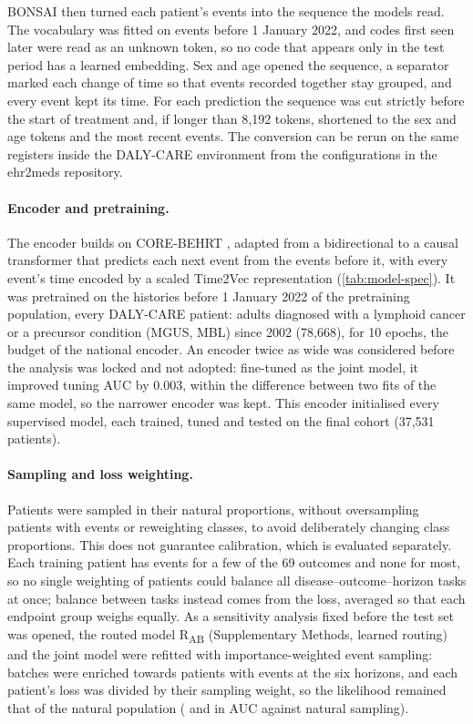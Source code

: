 BONSAI \citep{montgomery2025bonsai} then turned each patient's events into the
sequence the models read. The vocabulary was fitted on events before 1 January
2022, and codes first seen later were read as an unknown token, so no code that
appears only in the test period has a learned embedding. Sex and age opened the
sequence, a separator marked each change of time so that events recorded
together stay grouped, and every event kept its time. For each prediction the
sequence was cut strictly before the start of treatment and, if longer than
8,192 tokens, shortened to the sex and age tokens and the most recent events.
The conversion can be rerun on the same registers inside the DALY-CARE
environment from the configurations in the ehr2meds repository.


\paragraph{Encoder and pretraining.} The encoder builds on CORE-BEHRT
\citep{odgaard2024core}, adapted from a bidirectional to a causal transformer
\citep{vaswani2017attention} that predicts each next event from the events
before it, with every event's time encoded by a scaled Time2Vec representation
\citep{kazemi2019time2vec} (\cref{tab:model-spec}). It was pretrained on the
histories before 1 January 2022 of the pretraining population, every DALY-CARE
patient: adults diagnosed with a lymphoid cancer or a precursor condition (MGUS,
MBL) since 2002 (78,668), for 10 epochs, the budget of the national encoder. An encoder twice as
wide was considered before the analysis was locked and not adopted: fine-tuned
as the joint model, it improved tuning AUC by 0.003, within the difference
between two fits of the same model, so the narrower encoder was kept. This encoder initialised
every supervised model, each trained, tuned and tested on the final
cohort (37,531 patients).

\paragraph{Sampling and loss weighting.} Patients were sampled in their natural
proportions, without oversampling patients with events or reweighting classes,
to avoid deliberately changing class proportions. This does not guarantee
calibration, which is evaluated separately. Each training patient has events for a few of the 69 outcomes and
none for most, so no single weighting of patients could balance all
disease--outcome--horizon tasks at once; balance between tasks instead comes
from the loss, averaged so that each endpoint group weighs equally. As a
sensitivity analysis fixed before the test set was opened, the routed model
R\textsubscript{AB} (Supplementary Methods, learned routing) and the joint model were refitted with importance-weighted event sampling: batches were
enriched towards patients with events at the six horizons, and each patient's
loss was divided by their sampling weight, so the likelihood remained that of
the natural population ( and  in AUC
against natural sampling).

